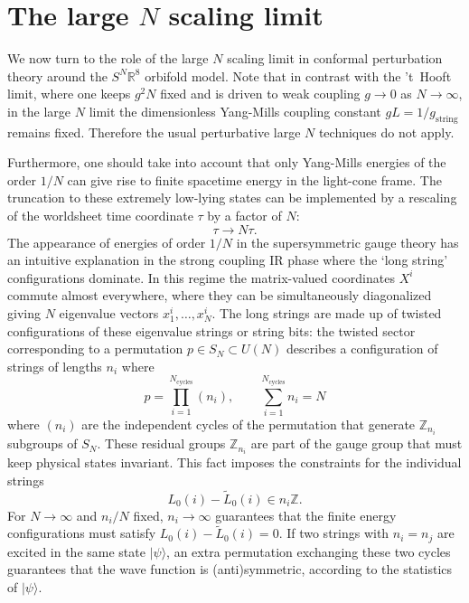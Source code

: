 \documentclass[nohyper,12pt,letterpaper]{JHEP3}
\def\IZ{{\mathbb Z}}           %
\def\IR{{\mathbb R}}
\def \tilde{\widetilde}
\def \eqn#1#2{\begin{equation}#2\label{#1}\end{equation}}
\def \gs{g_{\mathrm{string}}}
\begin{document}


\section{The large $N$ scaling limit\label{nscaling}}

We now turn to the role of the large $N$ scaling limit  in conformal 
perturbation theory around the $S^N \IR^8$ orbifold model.  Note that in 
contrast with the 't~Hooft limit, where one keeps $g^2N$ fixed and is 
driven to weak coupling $g\to 0$ as $N\to\infty$, in the large $N$ limit 
the dimensionless Yang-Mills coupling constant $gL=1/\gs$ remains fixed. 
Therefore the usual perturbative large $N$ techniques do not apply.

Furthermore, one should take into account  that only Yang-Mills energies 
of the order $1/N$ can give rise to finite spacetime energy in the 
light-cone frame. The truncation to these extremely low-lying states can 
be implemented by a rescaling of the worldsheet time coordinate $\tau$ by 
a factor of $N$:
\eqn{ntau}{\tau\to N\tau.}
The appearance of energies of order $1/N$ in the supersymmetric gauge
theory has an intuitive explanation in the strong coupling IR phase
where the `long string' configurations dominate. In this regime the
matrix-valued coordinates $X^i$ commute almost everywhere, where
they can be simultaneously diagonalized giving $N$ eigenvalue vectors
$x_1^i,\dots , x_N^i$. The long strings are made up of twisted configurations 
of these eigenvalue strings or string bits: the twisted sector 
corresponding to a permutation $p\in S_N\subset U(N)$ describes a
configuration of strings of lengths $n_i$ where
%
\eqn{cykly}{p=\prod_{i=1}^{N_{\mathrm{cycles}}} (n_i),
\qquad
\sum_{i=1}^{N_{\mathrm{cycles}}} n_i = N}
%
where $(n_i)$ are the independent cycles of the permutation that
generate $\IZ_{n_i}$ subgroups of $S_N$. These residual groups
$\IZ_{n_i}$ are part of the gauge group that must keep physical states
invariant. This fact imposes the constraints for the individual
strings
%
\eqn{levelma}{L_0(i) - \tilde L_0 (i) \in n_i \IZ.}
%
For $N\to\infty$ and $n_i/N$ fixed, $n_i\to\infty$ guarantees that the
finite energy configurations must satisfy $L_0(i)-\tilde L_0(i) = 0$.
If two strings with $n_i=n_j$ are excited in the same state
$|\psi\rangle$, an extra permutation exchanging these two cycles
guarantees that the wave function is (anti)symmetric, according to the
statistics of $|\psi\rangle$.
\end{document}
